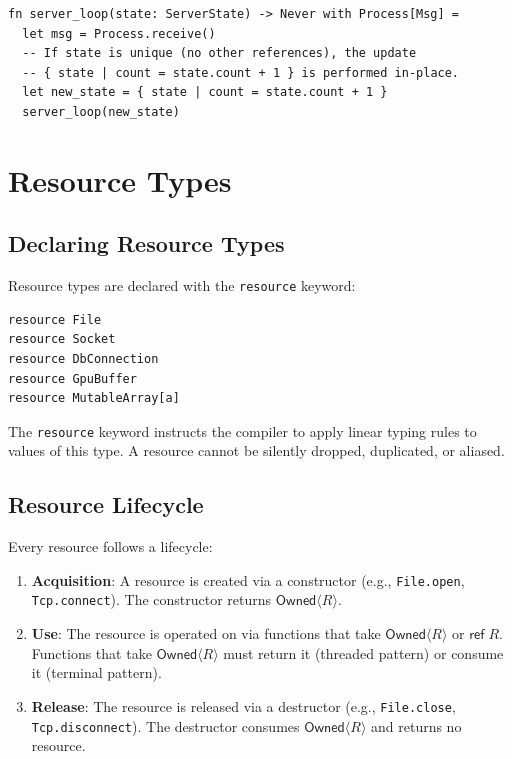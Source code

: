 \documentclass[11pt]{article}
\newcommand{\rref}{\mathsf{ref}}
\newcommand{\Owned}[1]{\mathsf{Owned}\langle #1 \rangle}
\begin{document}
\begin{lstlisting}[caption={Uniqueness inference enables in-place update},label={lst:uniqueness}]
fn server_loop(state: ServerState) -> Never with Process[Msg] =
  let msg = Process.receive()
  -- If state is unique (no other references), the update
  -- { state | count = state.count + 1 } is performed in-place.
  let new_state = { state | count = state.count + 1 }
  server_loop(new_state)
\end{lstlisting}


\section{Resource Types}\label{sec:resource-types}

\subsection{Declaring Resource Types}

Resource types are declared with the \texttt{resource} keyword:

\begin{lstlisting}[caption={Resource type declarations},label={lst:resource-decl}]
resource File
resource Socket
resource DbConnection
resource GpuBuffer
resource MutableArray[a]
\end{lstlisting}

The \texttt{resource} keyword instructs the compiler to apply linear
typing rules to values of this type.  A resource cannot be silently
dropped, duplicated, or aliased.

\subsection{Resource Lifecycle}\label{sec:lifecycle}

Every resource follows a lifecycle:

\begin{enumerate}
  \item \textbf{Acquisition}: A resource is created via a constructor
        (e.g., \texttt{File.open}, \texttt{Tcp.connect}).  The
        constructor returns $\Owned{R}$.
  \item \textbf{Use}: The resource is operated on via functions that
        take $\Owned{R}$ or $\rref\; R$.  Functions that take
        $\Owned{R}$ must return it (threaded pattern) or consume it
        (terminal pattern).
  \item \textbf{Release}: The resource is released via a destructor
        (e.g., \texttt{File.close}, \texttt{Tcp.disconnect}).  The
        destructor consumes $\Owned{R}$ and returns no resource.
\end{enumerate}
\end{document}
